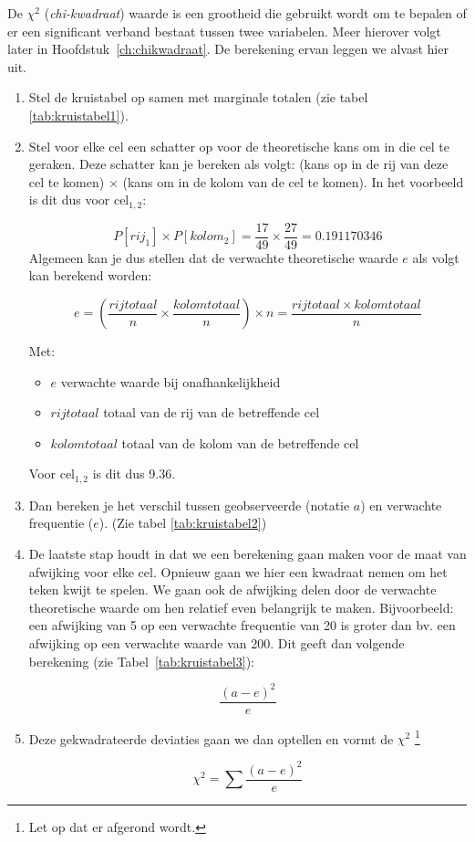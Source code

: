 De $\chi^{2}$ (\emph{chi-kwadraat}) waarde is een grootheid die gebruikt wordt om te bepalen of er een significant verband bestaat tussen twee variabelen. Meer hierover volgt later in Hoofdstuk~\ref{ch:chikwadraat}. De berekening ervan leggen we alvast hier uit.

\begin{enumerate}
  \item Stel de kruistabel op samen met marginale totalen (zie tabel \ref{tab:kruistabel1}).
  \item Stel voor elke cel een schatter op voor de theoretische kans om in die cel te geraken. Deze schatter kan je bereken als volgt: (kans op in de rij van deze cel te komen) $\times$ (kans om in de kolom van de cel te komen). In het voorbeeld is dit dus voor cel$_{1,2}$:
  
  \[P[rij_{1}] \times P[kolom_{2}] = \frac{17}{49} \times \frac{27}{49} = 0.191170346 \]
  Algemeen kan je dus stellen dat de verwachte theoretische waarde $e$ als volgt kan berekend worden:

  \begin{equation}
    e = (\frac{rijtotaal}{n} \times \frac{kolomtotaal}{n}) \times n = \frac{rijtotaal \times kolomtotaal}{n}
  \end{equation}

  Met:

  \begin{itemize}
    \item $e$ verwachte waarde bij onafhankelijkheid
    \item $rijtotaal$ totaal van de rij van de betreffende cel
    \item $kolomtotaal$ totaal van de kolom van de betreffende cel
  \end{itemize}

  Voor cel$_{1,2}$ is dit dus 9.36.
  
  \item Dan bereken je het verschil tussen geobserveerde (notatie $a$) en verwachte frequentie ($e$). (Zie tabel \ref{tab:kruistabel2})
  
  \item De laatste stap houdt in dat we een berekening gaan maken voor de maat van afwijking voor elke cel. Opnieuw gaan we hier een kwadraat nemen om het teken kwijt te spelen. We gaan ook de afwijking delen door de verwachte theoretische waarde om hen relatief even belangrijk te maken. Bijvoorbeeld: een afwijking van 5 op een verwachte frequentie van 20 is groter dan bv. een afwijking op een verwachte waarde van 200. Dit geeft dan volgende berekening (zie Tabel~\ref{tab:kruistabel3}):
  
  \begin{equation}
    \frac{(a-e)^{2}}{e}
  \end{equation}
  
  \item Deze gekwadrateerde deviaties gaan we dan optellen en vormt de $\chi^{2}$ \footnote{Let op dat er afgerond wordt.}
  
  \begin{equation}
    \chi^{2} = \sum \frac{(a-e)^{2}}{e}
  \end{equation}
\end{enumerate}

